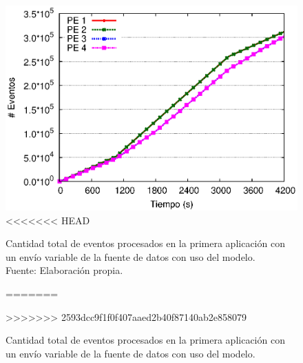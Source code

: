 \begin{figure}[!ht]
	\centering
	\captionsetup{justification=centering}
    \includegraphics[scale=0.7]{images/exp/app1/normal/cm/eventCount.eps}
<<<<<<< HEAD
    \caption[Cantidad total de eventos procesados en la primera aplicación con un envío variable de la fuente de datos con uso del modelo.]{Cantidad total de eventos procesados en la primera aplicación con un envío variable de la fuente de datos con uso del modelo.\\Fuente: Elaboración propia.}
=======
    \caption{Cantidad total de eventos procesados en la primera aplicaci\'on con un env\'io variable de la fuente de datos con uso del modelo.}
>>>>>>> 2593dcc9f1f0f407aaed2b40f87140ab2e858079
    \label{fig:app1-normal-eventCount-cm}
\end{figure}


